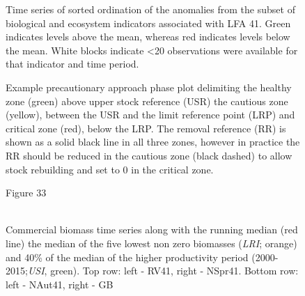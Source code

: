 \documentclass[11pt]{article}
\newcommand{\D}{.}
\newcommand{\e}{/SpinDr/backup/bio_data/bio.lobster/figures/} %
\begin{document}
\begin{figure}

    
    \caption{Time series of sorted ordination of the anomalies from the subset of biological and ecosystem indicators associated with LFA 41. Green indicates levels above the mean, whereas red indicates levels below the mean. White blocks indicate \textless 20 observations were available for that indicator and time period.}

\end{figure}



\begin{figure}
\centering
    \caption{Example precautionary approach phase plot delimiting the healthy zone (green) above upper stock reference (USR) the cautious zone (yellow), between the USR and the limit reference point (LRP) and critical zone (red), below the LRP. The removal reference (RR) is shown as a solid black line in all three zones, however in practice the RR should be reduced in the cautious zone (black dashed) to allow stock rebuilding and set to 0 in the critical zone.
}

\end{figure}


\begin{landscape}
\begin{figure}
\centering
        {Figure 33}\\
        \\
      
       \caption{Commercial biomass time series along with the running median (red line) the median of the five lowest non zero biomasses (\emph{LRI}; orange) and 40\% of the median of the higher productivity period (2000-2015;\emph{USI}, green). Top row: left - RV41, right - NSpr41. Bottom row: left - NAut41, right - GB}

\end{figure}
\end{landscape}
\end{document}

